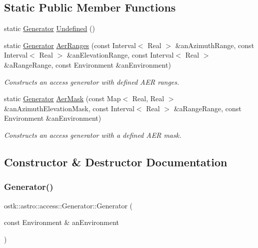 \subsection*{Static Public Member Functions}
\begin{DoxyCompactItemize}
\item 
static \hyperlink{classostk_1_1astro_1_1access_1_1_generator}{Generator} \hyperlink{classostk_1_1astro_1_1access_1_1_generator_a1fb2dd3d88187da24482168337a23ade}{Undefined} ()
\item 
static \hyperlink{classostk_1_1astro_1_1access_1_1_generator}{Generator} \hyperlink{classostk_1_1astro_1_1access_1_1_generator_aececdcffcfea35feb07d9214752e6995}{Aer\+Ranges} (const Interval$<$ Real $>$ \&an\+Azimuth\+Range, const Interval$<$ Real $>$ \&an\+Elevation\+Range, const Interval$<$ Real $>$ \&a\+Range\+Range, const Environment \&an\+Environment)
\begin{DoxyCompactList}\small\item\em Constructs an access generator with defined A\+ER ranges. \end{DoxyCompactList}\item 
static \hyperlink{classostk_1_1astro_1_1access_1_1_generator}{Generator} \hyperlink{classostk_1_1astro_1_1access_1_1_generator_a023edbe897ad6db339dce2107821442f}{Aer\+Mask} (const Map$<$ Real, Real $>$ \&an\+Azimuth\+Elevation\+Mask, const Interval$<$ Real $>$ \&a\+Range\+Range, const Environment \&an\+Environment)
\begin{DoxyCompactList}\small\item\em Constructs an access generator with a defined A\+ER mask. \end{DoxyCompactList}\end{DoxyCompactItemize}


\subsection{Constructor \& Destructor Documentation}
\mbox{\label{classostk_1_1astro_1_1access_1_1_generator_af609f21b3329033836220c55b75ab704}} 
\subsubsection{\texorpdfstring{Generator()}{Generator()}\hspace{0.1cm}{\footnotesize\ttfamily [1/2]}}
{\footnotesize\ttfamily ostk\+::astro\+::access\+::\+Generator\+::\+Generator (\begin{DoxyParamCaption}\item[{const Environment \&}]{an\+Environment }\end{DoxyParamCaption})}

